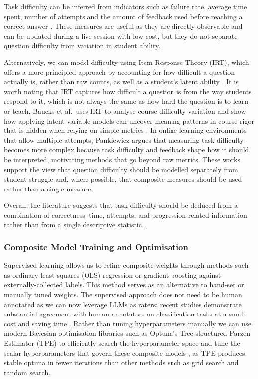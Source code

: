 Task difficulty can be inferred from indicators such as failure rate, average time spent, number of attempts and the amount of feedback used before reaching a correct answer \cite{dannath_evaluating,piech_modeling}.
These measures are useful as they are directly observable and can be updated during a live session with low cost, but they do not separate question difficulty from variation in student ability.

Alternatively, we can model difficulty using Item Response Theory (IRT), which offers a more principled approach by accounting for how difficult a question actually is, rather than raw counts, as well as a student's latent ability \cite{rasch1960probabilistic,lord1968statistical}. It is worth noting that IRT captures how difficult a question is from the way students respond to it, which is not always the same as how hard the question is to learn or teach.
Baucks et al.\ uses IRT to analyse course difficulty variation and show how applying latent variable models can uncover meaning patterns in course rigor that is hidden when relying on simple metrics \cite{frederikbaucks_2024_gaining}. 
In online learning environments that allow multiple attempts, Pankiewicz argues that measuring task difficulty becomes more complex because task difficulty and feedback shape how it should be interpreted, motivating methods that go beyond raw metrics. \cite{pankiewicz_measuring}  
These works support the view that question difficulty should be modelled separately from student struggle and, where possible, that composite measures should be used rather than a single measure.

Overall, the literature suggests that task difficulty should be deduced from a combination of correctness, time, attempts, and progression-related information rather than from a single descriptive statistic \cite{dannath_evaluating,piech_modeling}.


\subsubsection{Composite Model Training and Optimisation}

Supervised learning allows us to refine composite weights through methods such as ordinary least squares (OLS) regression \cite{hastieElementsStatisticalLearning2009} or gradient boosting against externally-collected labels.
This method serves as an alternative to hand-set or manually tuned weights.
The supervised approach does not need to be human annotated as we can now leverage LLMs as raters; recent studies demonstrate substantial agreement with human annotators on classification tasks at a small cost and saving time \cite{gilardiChatGPTOutperformsCrowd2023, chiangCanLargeLanguage2023, zhengJudgingLLMasaJudgeMTBench2023, liuGEvalNLGEvaluation2023}.
Rather than tuning hyperparameters manually we can use modern Bayesian optimisation libraries such as Optuna's Tree-structured Parzen Estimator (TPE) to efficiently search the hyperparameter space and tune the scalar hyperparameters that govern these composite models \cite{NIPS2011_86e8f7ab, akibaOptunaNextgenerationHyperparameter2019}, as TPE produces stable optima in fewer iterations than other methods such as grid search and random search.

